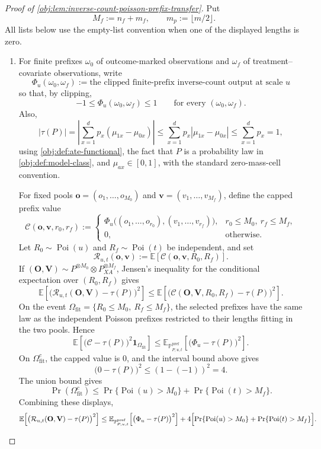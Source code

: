 \documentclass[11pt]{article}
\begin{document}
\begin{proof}[Proof of \cref{obj:lem:inverse-count-poisson-prefix-transfer}]
Put
\[
M_f:=n_f+m_f,\qquad m_p:=\lfloor m/2\rfloor .
\]
All lists below use the empty-list convention when one of the displayed lengths is zero.

\begin{enumerate}
\item
For finite prefixes \(\omega_0\) of outcome-marked observations and \(\omega_f\) of treatment--covariate observations, write
\[
\Phi_u(\omega_0,\omega_f)
:=
\text{the clipped finite-prefix inverse-count output at scale }u
\]
so that, by clipping,
\[
-1\le \Phi_u(\omega_0,\omega_f)\le 1
\qquad\text{for every }(\omega_0,\omega_f).
\]
Also,
\[
|\tau(P)|
=
\left|\sum_{x=1}^{d}p_x(\mu_{1x}-\mu_{0x})\right|
\le
\sum_{x=1}^{d}p_x|\mu_{1x}-\mu_{0x}|
\le
\sum_{x=1}^{d}p_x
=1,
\]
using \cref{obj:def:ate-functional}, the fact that \(P\) is a probability law in \cref{obj:def:model-class}, and \(\mu_{ax}\in[0,1]\), with the standard zero-mass-cell convention.

For fixed pools \(\mathbf o=(o_1,\ldots,o_{M_0})\) and \(\mathbf v=(v_1,\ldots,v_{M_f})\), define the capped prefix value
\[
\mathcal C(\mathbf o,\mathbf v,r_0,r_f)
:=
\begin{cases}
\Phi_u\bigl((o_1,\ldots,o_{r_0}),(v_1,\ldots,v_{r_f})\bigr),
& r_0\le M_0,\ r_f\le M_f,\\
0,&\text{otherwise}.
\end{cases}
\]
Let \(R_0\sim\operatorname{Poi}(u)\) and \(R_f\sim\operatorname{Poi}(t)\) be independent, and set
\[
\mathcal R_{u,t}(\mathbf o,\mathbf v)
:=
\mathbb E\!\left[\mathcal C(\mathbf o,\mathbf v,R_0,R_f)\right].
\]
If \((\mathbf O,\mathbf V)\sim P^{\otimes M_0}\otimes P_{XA}^{\otimes M_f}\), Jensen's inequality for the conditional expectation over \((R_0,R_f)\) gives
\[
\mathbb E\!\left[
  \bigl(\mathcal R_{u,t}(\mathbf O,\mathbf V)-\tau(P)\bigr)^2
\right]
\le
\mathbb E\!\left[
  \bigl(\mathcal C(\mathbf O,\mathbf V,R_0,R_f)-\tau(P)\bigr)^2
\right].
\]
On the event \(\Omega_{\mathrm{fit}}=\{R_0\le M_0,\ R_f\le M_f\}\), the selected prefixes have the same law as the independent Poisson prefixes restricted to their lengths fitting in the two pools. Hence
\[
\mathbb E\!\left[
  \bigl(\mathcal C-\tau(P)\bigr)^2\mathbf 1_{\Omega_{\mathrm{fit}}}
\right]
\le
\mathbb E_{\mathbb P^{\mathrm{pref}}_{P,u,t}}\!\left[
  \bigl(\Phi_u-\tau(P)\bigr)^2
\right].
\]
On \(\Omega_{\mathrm{fit}}^c\), the capped value is \(0\), and the interval bound above gives
\[
\bigl(0-\tau(P)\bigr)^2\le (1-(-1))^2=4.
\]
The union bound gives
\[
\Pr(\Omega_{\mathrm{fit}}^c)
\le
\Pr\{\operatorname{Poi}(u)>M_0\}
+
\Pr\{\operatorname{Poi}(t)>M_f\}.
\]
Combining these displays,
\[
\mathbb E\!\left[
  \bigl(\mathcal R_{u,t}(\mathbf O,\mathbf V)-\tau(P)\bigr)^2
\right]
\le
\mathbb E_{\mathbb P^{\mathrm{pref}}_{P,u,t}}\!\left[
  \bigl(\Phi_u-\tau(P)\bigr)^2
\right]
+4\Bigl[
  \Pr\{\operatorname{Poi}(u)>M_0\}
  +
  \Pr\{\operatorname{Poi}(t)>M_f\}
\Bigr].
\]


\end{enumerate}
\end{proof}
\end{document}
